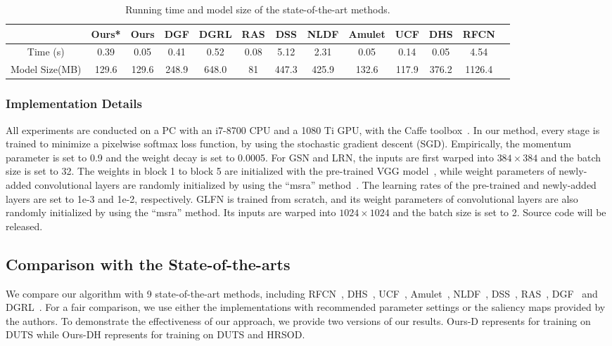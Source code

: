 \documentclass[10pt,twocolumn,letterpaper]{article}
\begin{document}
\begin{table*}[htp]
\begin{center}
\label{tab:runtime}
\vspace{-2mm}
\begin{tabular}{|c|c|c|c|c|c|c|c|c|c|c|c|c|}
\hline
&Ours*&Ours&DGF&DGRL&RAS&DSS&NLDF&Amulet&UCF&DHS&RFCN \\
\cline{2-9}
\hline
Time (s)&0.39&0.05&0.41&0.52&0.08&5.12&2.31&0.05&0.14&0.05&4.54\\
\hline
Model Size(MB) &129.6&129.6&248.9&648.0&81&447.3&425.9&132.6&117.9&376.2&1126.4\\

\hline
\end{tabular}
\vspace{-2mm}
\end{center}
\caption{Running time and model size of the state-of-the-art methods.}\label{tab:time}
\vspace{-3mm}
\end{table*}
\subsubsection{Implementation Details}

All experiments are conducted on a PC with an i7-8700 CPU and a 1080 Ti GPU, with the Caffe toolbox~\cite{jia2014caffe}.
In our method, every stage is trained to minimize a pixelwise softmax loss function, by using the stochastic gradient descent (SGD). Empirically, the momentum parameter is set to 0.9 and the weight decay is set to 0.0005.
For GSN and LRN, the inputs are first warped into $384\times384$ and the batch size is set to 32. The weights in block 1 to block 5 are initialized with the pre-trained VGG model~\cite{simonyan2014very}, while weight parameters of newly-added convolutional layers are randomly initialized by using the ``msra'' method~\cite{he2015delving}. The learning rates of the pre-trained and newly-added layers are set to 1e-3 and 1e-2, respectively. GLFN is trained from scratch, and its weight parameters of convolutional layers are also randomly initialized by using the ``msra'' method. Its inputs are warped into $1024\times1024$ and the batch size is set to 2. Source code will be released.

\subsection{Comparison with the State-of-the-arts}
We compare our algorithm with 9 state-of-the-art methods, including
RFCN~\cite{wang2016saliency}, DHS~\cite{liu2016dhsnet}, UCF~\cite{zhang2017learning}, Amulet~\cite{zhang2017amulet}, NLDF~\cite{luo2017non}, DSS~\cite{hou2017deeply}, RAS~\cite{chen2018reverse}, DGF~\cite{wu2018fast} and DGRL~\cite{wang2018detect}. For a fair comparison, we use either the implementations with recommended parameter settings
or the saliency maps provided by the authors. To demonstrate the effectiveness of our approach, we provide two versions of our results. Ours-D represents for training on DUTS while Ours-DH represents for training on DUTS and HRSOD.
\end{document}
